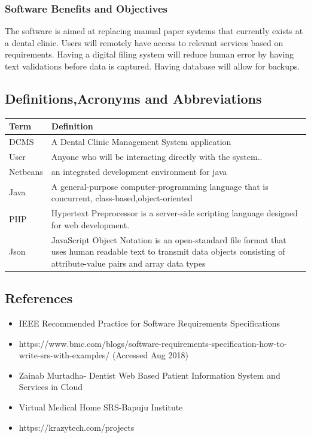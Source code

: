 \documentclass[11 pt]{article}
\begin{document}
\subsubsection{Software Benefits and Objectives}
The software is aimed at replacing manual paper systems that currently exists at a dental clinic.
Users will remotely have access to relevant services based on requirements.
Having a digital filing system will reduce human error by having text validations before data is captured. Having database will allow for backups.

\subsection{Definitions,Acronyms and Abbreviations}
\begin{tabular}{|p{3cm}|p{9cm}|}
\hline
\textbf{Term} & \textbf{Definition}\\
\hline
DCMS &  A Dental Clinic Management System application\\
\hline
User &  Anyone who will be interacting directly with the system..\\
\hline
Netbeans & an integrated development environment for java\\
\hline
Java & A general-purpose computer-programming language that is concurrent, class-based,object-oriented\\
\hline
PHP & Hypertext Preprocessor is a server-side scripting language designed for web development. \\
\hline
Json & JavaScript Object Notation is an open-standard file format that uses human readable text to transmit data objects consisting of attribute-value pairs and array data types \\
\hline
\end{tabular}

\subsection{References}
\begin{itemize}
    \item    
    IEEE Recommended Practice for Software Requirements Specifications
    \item
    https://www.bmc.com/blogs/software-requirements-specification-how-to-write-srs-with-examples/ (Accessed Aug 2018)
    \item
    Zainab Murtadha- Dentist Web Based Patient Information System and Services in Cloud
    \item
    Virtual Medical Home SRS-Bapuju Institute
    \item
    https://krazytech.com/projects
    \end{itemize}
    \newpage
\end{document}
